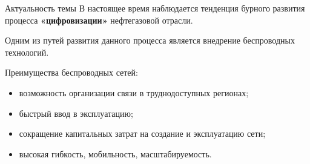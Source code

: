 \begin{frame}
    {Актуальность темы}
    \justifying
    В настоящее время наблюдается тенденция бурного развития процесса \textbf{«цифровизации»} нефтегазовой отрасли.
    
    \bigskip

    Одним из путей развития данного процесса является внедрение беспроводных технологий.
    \bigskip

    Преимущества беспроводных сетей:
    \begin{itemize}
        \item возможность организации связи в труднодоступных регионах;
        \item быстрый ввод в эксплуатацию;
        \item сокращение капитальных затрат на создание и эксплуатацию сети; 
        \item высокая гибкость, мобильность, масштабируемость.
    \end{itemize}

    
\end{frame}


